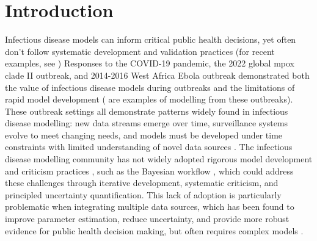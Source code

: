 \documentclass{article}
\begin{document}
\tableofcontents
\newpage

\section{Introduction}

Infectious disease models can inform critical public health decisions, yet often don't follow systematic development and validation practices (for recent examples, see \citep{Ward2024-sp, Fyles2024-qz, Abbott2021-delta, Abbott2022-prevalence})
Responses to the COVID-19 pandemic, the 2022 global mpox clade II outbreak, and 2014-2016 West Africa Ebola outbreak demonstrated both the value of infectious disease models during outbreaks and the limitations of rapid model development (\citep{knock2021key, ro2025estimating, Abbott2021-delta, Abbott2022-prevalence, Ward2024-sp, birrell2025real} are examples of modelling  from these outbreaks).
These outbreak settings all demonstrate patterns widely found in infectious disease modelling: new data streams emerge over time, surveillance systems evolve to meet changing needs, and models must be developed under time constraints with limited understanding of novel data sources \citep{mccaw2023role}.
The infectious disease modelling community has not widely adopted rigorous model development and criticism practices \citep{box1979robustness}, such as the Bayesian workflow \citep{green2003highly,gelman2020bayesian, nicholson2022interoperability}, which could address these challenges through iterative development, systematic criticism, and principled uncertainty quantification.
This lack of adoption is particularly problematic when integrating multiple data sources, which has been found to improve parameter estimation, reduce uncertainty, and provide more robust evidence for public health decision making, but often requires complex models \citep{deangelis2018analysing, sherratt2021exploring}.
\end{document}
